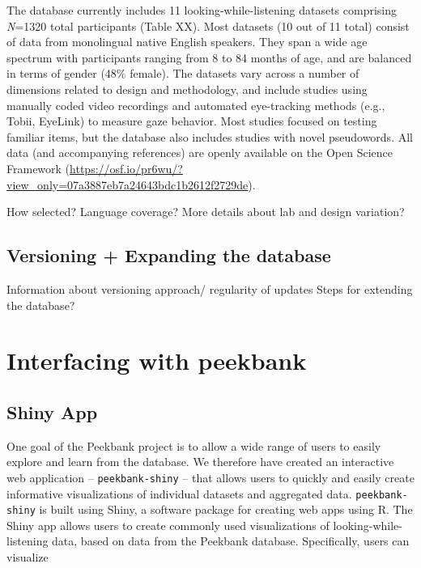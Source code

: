 \documentclass[
  english,
  man,floatsintext]{apa6}
\begin{document}
The database currently includes 11 looking-while-listening datasets comprising \emph{N}=1320 total participants (Table XX).
Most datasets (10 out of 11 total) consist of data from monolingual native English speakers.
They span a wide age spectrum with participants ranging from 8 to 84 months of age, and are balanced in terms of gender (48\% female).
The datasets vary across a number of dimensions related to design and methodology, and include studies using manually coded video recordings and automated eye-tracking methods (e.g., Tobii, EyeLink) to measure gaze behavior.
Most studies focused on testing familiar items, but the database also includes studies with novel pseudowords.
All data (and accompanying references) are openly available on the Open Science Framework (\url{https://osf.io/pr6wu/?view_only=07a3887eb7a24643bdc1b2612f2729de}).

How selected?
Language coverage?
More details about lab and design variation?

\hypertarget{versioning-expanding-the-database}{%
\subsection{Versioning + Expanding the database}\label{versioning-expanding-the-database}}

Information about versioning approach/ regularity of updates Steps for extending the database?

\hypertarget{interfacing-with-peekbank}{%
\section{Interfacing with peekbank}\label{interfacing-with-peekbank}}

\hypertarget{shiny-app}{%
\subsection{Shiny App}\label{shiny-app}}

One goal of the Peekbank project is to allow a wide range of users to easily explore and learn from the database.
We therefore have created an interactive web application -- \texttt{peekbank-shiny} -- that allows users to quickly and easily create informative visualizations of individual datasets and aggregated data.
\texttt{peekbank-shiny} is built using Shiny, a software package for creating web apps using R.
The Shiny app allows users to create commonly used visualizations of looking-while-listening data, based on data from the Peekbank database.
Specifically, users can visualize
\end{document}
